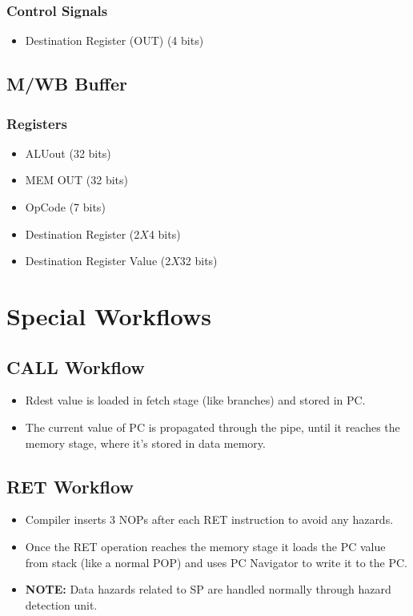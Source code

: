 \subsubsection{Control Signals}
\begin{itemize}
    \item Destination Register (OUT) (4 bits)
\end{itemize}

\subsection{M/WB Buffer}

\subsubsection{Registers}
\begin{itemize}
    \item ALUout (32 bits)
    \item MEM OUT (32 bits)
    \item OpCode (7 bits)
    \item Destination Register (2$X$4 bits)
    \item Destination Register Value (2$X$32 bits)
\end{itemize}


\section{Special Workflows}

\subsection{CALL Workflow}
\begin{itemize}
    \item Rdest value is loaded in fetch stage (like branches) and stored in PC.
    \item The current value of PC is propagated through the pipe, until it reaches the memory stage, where it's stored in data memory.
\end{itemize}

\subsection{RET Workflow}
\begin{itemize}
    \item Compiler inserts 3 NOPs after each RET instruction to avoid any hazards.
    \item Once the RET operation reaches the memory stage it loads the PC value from stack (like a normal POP) and uses PC Navigator to write it to the PC.
    \item \textbf{NOTE:} Data hazards related to SP are handled normally through hazard detection unit.
\end{itemize}

